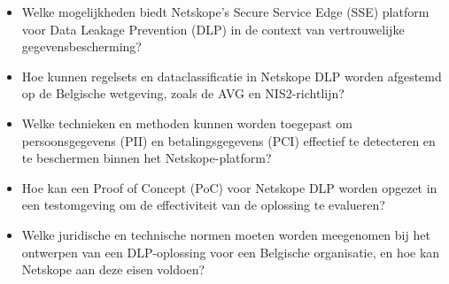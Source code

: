 \begin{itemize}
    \item Welke mogelijkheden biedt Netskope's Secure Service Edge (SSE) platform voor Data Leakage Prevention (DLP) in de context van vertrouwelijke gegevensbescherming?
    \item Hoe kunnen regelsets en dataclassificatie in Netskope DLP worden afgestemd op de Belgische wetgeving, zoals de AVG en NIS2-richtlijn?
    \item Welke technieken en methoden kunnen worden toegepast om persoonsgegevens (PII) en betalingsgegevens (PCI) effectief te detecteren en te beschermen binnen het Netskope-platform?
    \item Hoe kan een Proof of Concept (PoC) voor Netskope DLP worden opgezet in een testomgeving om de effectiviteit van de oplossing te evalueren?
    \item Welke juridische en technische normen moeten worden meegenomen bij het ontwerpen van een DLP-oplossing voor een Belgische organisatie, en hoe kan Netskope aan deze eisen voldoen?
\end{itemize}





